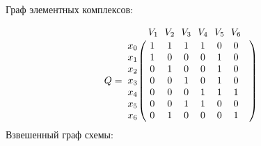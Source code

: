 \documentclass{article}
\begin{document}
Граф элементных комплексов:
\begin{figure}[h]
\end{figure}
$$
Q =
\bordermatrix{ & V_{1} \!&\! V_{2} \!&\! V_{3} \!&\! V_{4} \!&\! V_{5} \!&\! V_{6} \!&\! \cr 
x_{0} \!&\! 1 \!&\! 1 \!&\! 1 \!&\! 1 \!&\! 0 \!&\! 0 \!&\! \cr
x_{1} \!&\! 1 \!&\! 0 \!&\! 0 \!&\! 0 \!&\! 1 \!&\! 0 \!&\! \cr
x_{2} \!&\! 0 \!&\! 1 \!&\! 0 \!&\! 0 \!&\! 1 \!&\! 0 \!&\! \cr
x_{3} \!&\! 0 \!&\! 0 \!&\! 1 \!&\! 0 \!&\! 1 \!&\! 0 \!&\! \cr
x_{4} \!&\! 0 \!&\! 0 \!&\! 0 \!&\! 1 \!&\! 1 \!&\! 1 \!&\! \cr
x_{5} \!&\! 0 \!&\! 0 \!&\! 1 \!&\! 1 \!&\! 0 \!&\! 0 \!&\! \cr
x_{6} \!&\! 0 \!&\! 1 \!&\! 0 \!&\! 0 \!&\! 0 \!&\! 1 \!&\! \cr
}$$
Взвешенный граф схемы:
\begin{figure}[h!]
\end{figure}
\end{document}
